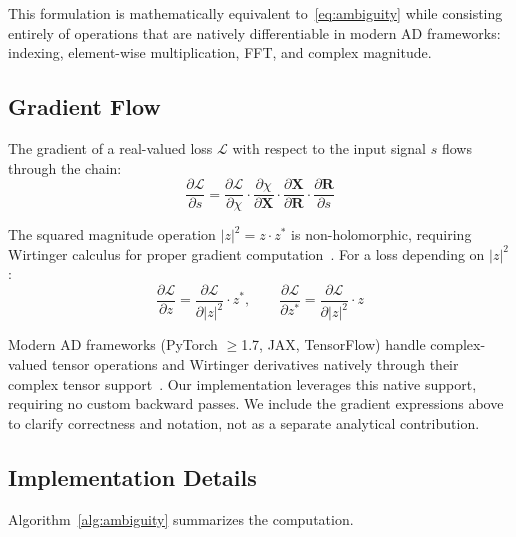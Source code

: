 \documentclass[journal]{IEEEtran}
\begin{document}
This formulation is mathematically equivalent to~\eqref{eq:ambiguity} while consisting entirely of operations that are natively differentiable in modern AD frameworks: indexing, element-wise multiplication, FFT, and complex magnitude.

\subsection{Gradient Flow}

The gradient of a real-valued loss $\mathcal{L}$ with respect to the input signal $s$ flows through the chain:
\begin{equation}
\frac{\partial \mathcal{L}}{\partial s} = \frac{\partial \mathcal{L}}{\partial \chi} \cdot \frac{\partial \chi}{\partial \mathbf{X}} \cdot \frac{\partial \mathbf{X}}{\partial \mathbf{R}} \cdot \frac{\partial \mathbf{R}}{\partial s}
\label{eq:chain}
\end{equation}

The squared magnitude operation $|z|^2 = z \cdot z^*$ is non-holomorphic, requiring Wirtinger calculus for proper gradient computation~\cite{baydin2018automatic}.
For a loss depending on $|z|^2$:
\begin{equation}
\frac{\partial \mathcal{L}}{\partial z} = \frac{\partial \mathcal{L}}{\partial |z|^2} \cdot z^*, \qquad
\frac{\partial \mathcal{L}}{\partial z^*} = \frac{\partial \mathcal{L}}{\partial |z|^2} \cdot z
\label{eq:wirtinger}
\end{equation}

Modern AD frameworks (PyTorch $\geq$1.7, JAX, TensorFlow) handle complex-valued tensor operations and Wirtinger derivatives natively through their complex tensor support~\cite{paszke2019pytorch}.
Our implementation leverages this native support, requiring no custom backward passes.
We include the gradient expressions above to clarify correctness and notation, not as a separate analytical contribution.

\subsection{Implementation Details}

Algorithm~\ref{alg:ambiguity} summarizes the computation.
\end{document}
